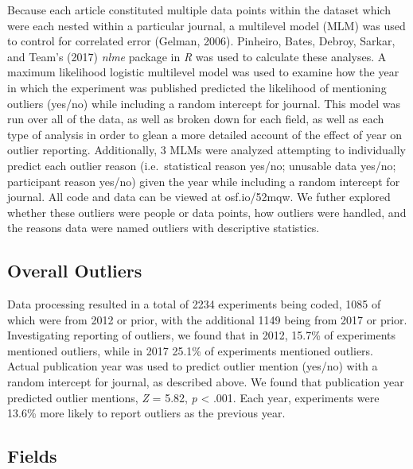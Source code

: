 \documentclass[english,man]{apa6}
\theoremstyle{definition}
\theoremstyle{definition}
\theoremstyle{definition}
\theoremstyle{remark}
\begin{document}
Because each article constituted multiple data points within the dataset
which were each nested within a particular journal, a multilevel model
(MLM) was used to control for correlated error (Gelman, 2006). Pinheiro,
Bates, Debroy, Sarkar, and Team's (2017) \emph{nlme} package in \emph{R}
was used to calculate these analyses. A maximum likelihood logistic
multilevel model was used to examine how the year in which the
experiment was published predicted the likelihood of mentioning outliers
(yes/no) while including a random intercept for journal. This model was
run over all of the data, as well as broken down for each field, as well
as each type of analysis in order to glean a more detailed account of
the effect of year on outlier reporting. Additionally, 3 MLMs were
analyzed attempting to individually predict each outlier reason
(i.e.~statistical reason yes/no; unusable data yes/no; participant
reason yes/no) given the year while including a random intercept for
journal. All code and data can be viewed at osf.io/52mqw. We futher
explored whether these outliers were people or data points, how outliers
were handled, and the reasons data were named outliers with descriptive
statistics.

\subsection{Overall Outliers}\label{overall-outliers}

Data processing resulted in a total of 2234 experiments being coded,
1085 of which were from 2012 or prior, with the additional 1149 being
from 2017 or prior. Investigating reporting of outliers, we found that
in 2012, 15.7\% of experiments mentioned outliers, while in 2017 25.1\%
of experiments mentioned outliers. Actual publication year was used to
predict outlier mention (yes/no) with a random intercept for journal, as
described above. We found that publication year predicted outlier
mentions, \emph{Z} = 5.82, \emph{p} \textless{} .001. Each year,
experiments were 13.6\% more likely to report outliers as the previous
year.

\subsection{Fields}\label{fields-1}
\end{document}
